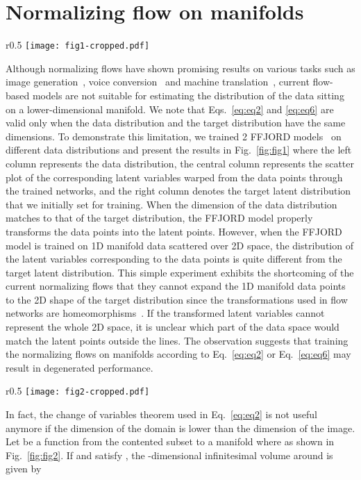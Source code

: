 \documentclass{article}
\begin{document}
\section{Normalizing flow on manifolds}
\begin{wrapfigure}{r}{0.5\textwidth}
\vskip -5pt
\texttt{[image: fig1-cropped.pdf]} 
\caption{Illustration of normalizing flow trained on 2D data distribution~(top) and 1D manifold data distribution~(bottom).}
\label{fig:fig1}
\end{wrapfigure}
Although normalizing flows have shown promising results on various tasks such as image generation~\citep{kingma2018glow}, voice conversion~\citep{serra2019blow} and machine translation~\citep{ma2019flowseq}, current flow-based models are not suitable for estimating the distribution of the data sitting on a lower-dimensional manifold. We note that Eqs.~\eqref{eq:eq2} and \eqref{eq:eq6} are valid only when the data distribution and the target distribution have the same dimensions. 
To demonstrate this limitation, we trained 2 FFJORD models~\citep{grathwohl2018ffjord} on different data distributions and present the results in Fig.~\ref{fig:fig1} where the left column represents the data distribution, the central column represents the scatter plot of the corresponding latent variables warped from the data points through the trained networks, and the right column denotes the target latent distribution that we initially set for training. When the dimension of the data distribution matches to that of the target distribution, the FFJORD model properly transforms the data points into the latent points. However, when the FFJORD model is trained on 1D manifold data scattered over 2D space, the distribution of the latent variables corresponding to the data points is quite different from the target latent distribution. This simple experiment exhibits the shortcoming of the current normalizing flows that they cannot expand the 1D manifold data points to the 2D shape of the target distribution since the transformations used in flow networks are homeomorphisms~\citep{dupont2019augmented}. If the transformed latent variables cannot represent the whole 2D space, it is unclear which part of the data space would match the latent points outside the lines. The observation suggests that training the normalizing flows on manifolds according to Eq.~\eqref{eq:eq2} or Eq.~\eqref{eq:eq6} may result in degenerated performance. 

\begin{wrapfigure}{r}{0.5\textwidth}
\vskip -7pt
\texttt{[image: fig2-cropped.pdf]} 
\caption{Example of the function that maps the contented subset of  to the manifold of .}
\label{fig:fig2}
\end{wrapfigure}
In fact, the change of variables theorem used in Eq.~\eqref{eq:eq2} is not useful anymore if the dimension of the domain is lower than the dimension of the image. Let  be a function from the contented subset  to a manifold  where  as shown in Fig.~\ref{fig:fig2}. If  and  satisfy , the -dimensional infinitesimal volume  around  is given by
\end{document}
